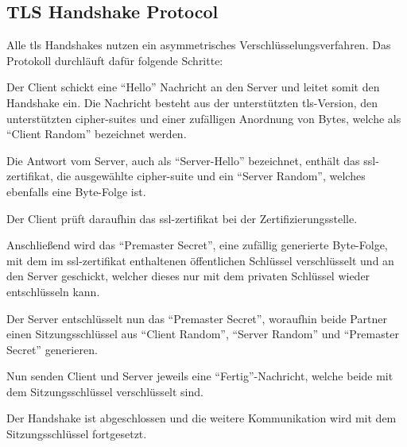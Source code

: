 \subsection{TLS Handshake Protocol}\label{subsec:tls-handshake-protocol}
	Alle \gls{tls} Handshakes nutzen ein asymmetrisches Verschlüsselungsverfahren.
	Das Protokoll durchläuft dafür folgende Schritte:

	\begin{compactenum}
		\item Der Client schickt eine \enquote{Hello} Nachricht an den Server
		und leitet somit den Handshake ein.
		Die Nachricht besteht aus der unterstützten \gls{tls}-Version,
		den unterstützten \glspl{cipher-suite}
		und einer zufälligen Anordnung von Bytes,
		welche als \enquote{Client Random} bezeichnet werden.

		\item Die Antwort vom Server,
		auch als \enquote{Server-Hello} bezeichnet,
		enthält das \gls{ssl-zertifikat},
		die ausgewählte \gls{cipher-suite} und ein \enquote{Server Random},
		welches ebenfalls eine Byte-Folge ist.

		\item Der Client prüft daraufhin das \gls{ssl-zertifikat} bei der Zertifizierungsstelle.

		\item Anschließend wird das \enquote{Premaster Secret},
		eine zufällig generierte Byte-Folge,
		mit dem im \gls{ssl-zertifikat} enthaltenen öffentlichen Schlüssel verschlüsselt
		und an den Server geschickt,
		welcher dieses nur mit dem privaten Schlüssel wieder entschlüsseln kann.

		\item Der Server entschlüsselt nun das \enquote{Premaster Secret},
		woraufhin beide Partner einen Sitzungsschlüssel aus \enquote{Client Random},
		\enquote{Server Random} und \enquote{Premaster Secret} generieren.

		\item Nun senden Client und Server jeweils eine \enquote{Fertig}-Nachricht,
		welche beide mit dem Sitzungsschlüssel verschlüsselt sind.

		\item Der Handshake ist abgeschlossen
		und die weitere Kommunikation wird mit dem Sitzungsschlüssel fortgesetzt.

	\end{compactenum}